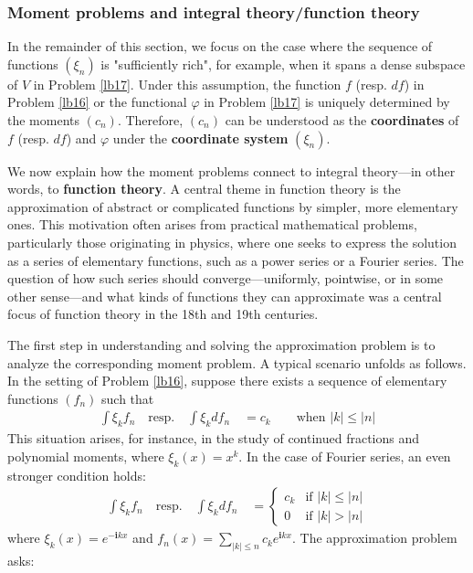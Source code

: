 \documentclass[12pt,b5paper,notitlepage]{article}
\theoremstyle{definition}
\theoremstyle{plain}
\newcommand{\im}{\mathbf{i}}
\numberwithin{equation}{section}
\begin{document}
\subsubsection{Moment problems and integral theory/function theory}\label{lb19}


In the remainder of this section, we focus on the case where the sequence of functions $(\xi_n)$ is "sufficiently rich", for example, when it spans a dense subspace of $V$ in Problem \ref{lb17}. Under this assumption, the function $f$ (resp. $df$) in Problem \ref{lb16} or the functional $\varphi$ in Problem \ref{lb17} is uniquely determined by the moments $(c_n)$. Therefore, $(c_n)$ can be understood as the \textbf{coordinates} of $f$ (resp. $df$) and $\varphi$ under the \textbf{coordinate system} $(\xi_n)$.


We now explain how the moment problems connect to integral theory---in other words, to \textbf{function theory}. A central theme in function theory is the approximation of abstract or complicated functions by simpler, more elementary ones. This motivation often arises from practical mathematical problems, particularly those originating in physics, where one seeks to express the solution as a series of elementary functions, such as a power series or a Fourier series. The question of how such series should converge---uniformly, pointwise, or in some other sense---and what kinds of functions they can approximate was a central focus of function theory in the 18th and 19th centuries.


The first step in understanding and solving the approximation problem is to analyze the corresponding moment problem. A typical scenario unfolds as follows. In the setting of Problem \ref{lb16}, suppose there exists a sequence of elementary functions $(f_n)$ such that
\begin{align}\label{eq5}
\int \xi_k f_n\quad\text{resp.}\quad \int \xi_kdf_n\quad=c_k\qquad \text{when $|k|\leq |n|$}
\end{align}
This situation arises, for instance, in the study of continued fractions and polynomial moments, where $\xi_k(x)=x^k$. In the case of Fourier series, an even stronger condition holds:
\begin{align}\label{eq6}
\int \xi_k f_n\quad\text{resp.}\quad\int \xi_k df_n\quad=\left\{
\begin{array}{ll}
c_k&\text{if }|k|\leq |n|\\[0.5ex]
0&\text{if }|k|>|n|
\end{array}
\right.
\end{align}
where $\xi_k(x)=e^{-\im kx}$ and $f_n(x)=\sum_{|k|\leq n}c_k e^{\im kx}$. The approximation problem asks:
\end{document}
